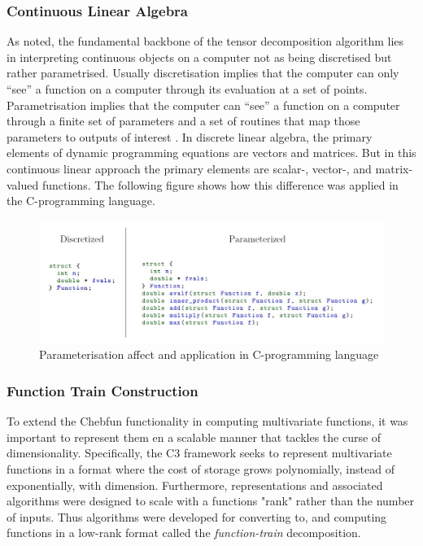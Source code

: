 \documentclass[11pt,draftd]{article}
\begin{document}
\subsubsection{Continuous Linear Algebra}
As noted, the fundamental backbone of the tensor decomposition algorithm lies in interpreting continuous objects on a computer not as being discretised but rather parametrised. Usually discretisation implies that the computer can only “see” a function on a computer through its evaluation at a set of points. Parametrisation implies that the computer can “see” a function on a computer through a finite set of parameters and a set of routines that map those parameters to outputs of interest \cite{thesis}. In discrete linear algebra, the primary elements of dynamic programming equations are vectors and matrices. But in this continuous linear approach the primary elements are scalar-, vector-, and matrix-valued functions. The following figure shows how this difference was applied in the C-programming language.

\begin{figure}[h!]
	\centering
	\includegraphics[scale = 0.4]{ContinuousLinearAlgebraDifference1}
	\caption{Parameterisation affect and application in C-programming language}
\end{figure}

\subsubsection{Function Train Construction}
To extend the Chebfun functionality in computing multivariate functions, it was important to represent them en a scalable manner that tackles the curse of dimensionality. Specifically, the C3 framework seeks to represent multivariate functions in a format where the cost of storage grows polynomially, instead of exponentially, with dimension. Furthermore, representations and associated algorithms were designed to scale with a functions "rank" rather than the number of inputs. Thus algorithms were developed for converting to, and computing functions in a low-rank format called the \textit{function-train} decomposition.
\end{document}
